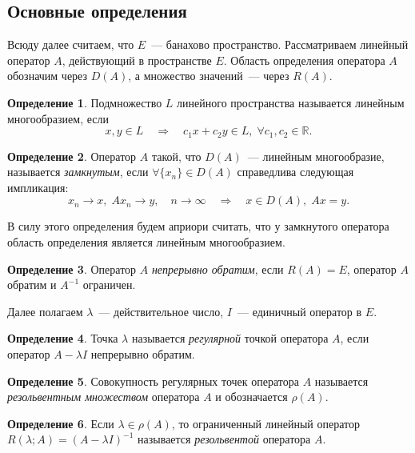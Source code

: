 \documentclass{article}
\theoremstyle{definition}
\newtheorem{definition}{Определение}
\begin{document}
\subsection{Основные определения}
Всюду далее считаем, что $E$~--- банахово пространство. Рассматриваем линейный оператор $A$, действующий в пространстве $E$.
Область определения оператора $A$ обозначим через $D(A)$, а множество значений~--- через $R(A)$.
\begin{definition} \label{linear manifold}
	Подмножество $L$ линейного пространства называется линейным многообразием, если
	\begin{equation*}
		x, y \in L \quad \Longrightarrow \quad c_1x + c_2y \in L, \; \forall c_1, c_2 \in \mathbb{R}.
	\end{equation*}
\end{definition}

\begin{definition} \label{closed operator}
	Оператор $A$ такой, что $ D(A) $~--- линейным многообразие,
	называется \textit{замкнутым}, если $\forall \{x_n\}  \in D(A)$ справедлива следующая импликация:
	\begin{equation*}
		x_n \rightarrow x, \; Ax_n \rightarrow y, \quad n \rightarrow \infty  \quad \Longrightarrow \quad x \in D(A), \; Ax = y. 
	\end{equation*}
\end{definition}

В силу этого определения будем априори считать, 
что у замкнутого оператора область определения является линейным многообразием.

\begin{definition}
	Оператор $A$ \textit{непрерывно обратим}, если $R(A) = E$, оператор $A$ обратим и $A^{-1}$ ограничен.
\end{definition}

	Далее полагаем $\lambda$~--- действительное число, $I$~--- единичный оператор в $E$.
	
\begin{definition}
	Точка $\lambda$ называется \textit{регулярной} точкой оператора $A$, если оператор $A - \lambda I$ непрерывно обратим.
\end{definition}

\begin{definition}
	Совокупность регулярных точек оператора $A$ называется \textit{резольвентным множеством} оператора $A$
	и обозначается $\rho(A)$.
\end{definition}

\begin{definition} \label{resolvent}
	Если $\lambda \in \rho(A)$, то ограниченный линейный оператор \linebreak $R(\lambda; A) = (A - \lambda I)^{-1}$ называется 
	\textit{резольвентой} оператора $A$.
\end{definition}
\end{document}
